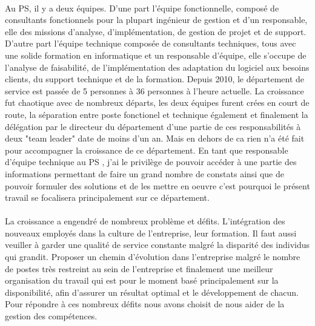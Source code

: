 \paragraph{}Au PS, il y a deux équipes. D'une part l'équipe fonctionnelle, composé de consultants fonctionnels pour la plupart ingénieur de gestion et d'un responsable, elle des missions d'analyse, d'implémentation, de gestion de projet et de support. D'autre part l'équipe technique composée de consultants techniques, tous avec une solide formation en informatique et un responsable d'équipe, elle s'occupe de l'analyse de faisabilité, de l'implémentation des adaptation du logiciel aux besoins clients, du support technique et de la formation. Depuis 2010, le département de service est passée de 5 personnes à 36 personnes à l'heure actuelle. La croissance fut chaotique avec de nombreux départs, les deux équipes furent crées en court de route, la séparation entre poste fonctionel et technique également et finalement la délégation par le directeur du département d'une partie de ces responsabilités à deux "team leader" date de moins d'un an. Mais en dehors de ca rien n'a été fait pour accompagner la croissance de ce département. En tant que responsable d’équipe technique au PS , j’ai le privilège de pouvoir accéder à une partie des informations permettant de faire un grand nombre de constats ainsi que de pouvoir formuler des solutions et de les mettre en oeuvre c'est pourquoi le présent travail se focalisera principalement sur ce département.


\paragraph*{}La croissance a engendré de nombreux problème et défits. L'intégration des nouveaux employés dans la culture de l'entreprise, leur formation. Il faut aussi veuiller à garder une qualité de service constante malgré la disparité des individus qui grandit. Proposer un chemin d'évolution dans l'entreprise malgré le nombre de postes très restreint au sein de l'entreprise et finalement une meilleur organisation du travail qui est pour le moment basé principalement sur la disponibilité, afin d'assurer un résultat optimal et le développement de chacun. Pour répondre à ces nombreux défits nous avons choisit de nous aider de la gestion des compétences.

